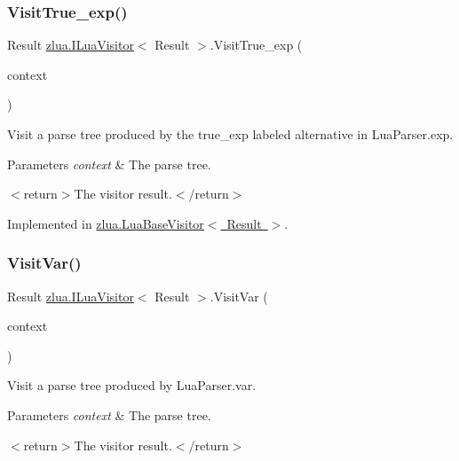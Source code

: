 \subsubsection{\texorpdfstring{Visit\+True\+\_\+exp()}{VisitTrue\_exp()}}
{\footnotesize\ttfamily Result \mbox{\hyperlink{interfacezlua_1_1_i_lua_visitor}{zlua.\+I\+Lua\+Visitor}}$<$ Result $>$.Visit\+True\+\_\+exp (\begin{DoxyParamCaption}\item[{\mbox{[}\+Not\+Null\mbox{]} \mbox{\hyperlink{classzlua_1_1_lua_parser_1_1_true__exp_context}{Lua\+Parser.\+True\+\_\+exp\+Context}}}]{context }\end{DoxyParamCaption})}



Visit a parse tree produced by the {\ttfamily true\+\_\+exp} labeled alternative in Lua\+Parser.\+exp. 


\begin{DoxyParams}{Parameters}
{\em context} & The parse tree.\\
\hline
\end{DoxyParams}
$<$return$>$The visitor result.$<$/return$>$ 

Implemented in \mbox{\hyperlink{classzlua_1_1_lua_base_visitor_a63cf2709c52b89ca59db1826feef9c30}{zlua.\+Lua\+Base\+Visitor$<$ Result $>$}}.

\mbox{\label{interfacezlua_1_1_i_lua_visitor_aabb3bb5fa7b497446863e037f93733e7}} 
\subsubsection{\texorpdfstring{Visit\+Var()}{VisitVar()}}
{\footnotesize\ttfamily Result \mbox{\hyperlink{interfacezlua_1_1_i_lua_visitor}{zlua.\+I\+Lua\+Visitor}}$<$ Result $>$.Visit\+Var (\begin{DoxyParamCaption}\item[{\mbox{[}\+Not\+Null\mbox{]} \mbox{\hyperlink{classzlua_1_1_lua_parser_1_1_var_context}{Lua\+Parser.\+Var\+Context}}}]{context }\end{DoxyParamCaption})}



Visit a parse tree produced by Lua\+Parser.\+var. 


\begin{DoxyParams}{Parameters}
{\em context} & The parse tree.\\
\hline
\end{DoxyParams}
$<$return$>$The visitor result.$<$/return$>$ 


